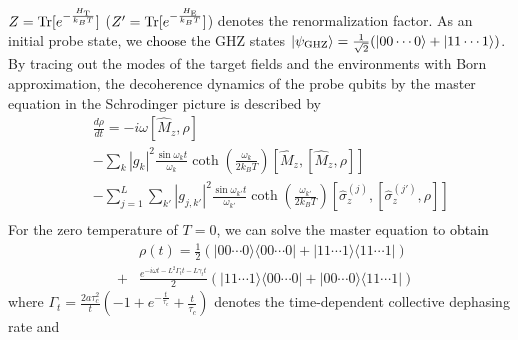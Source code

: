 \documentclass[prl,twocolumn,superscriptaddress]{revtex4}
\begin{document}
   $Z={\rm{Tr}}[e^{-\frac{H_{\rm{T}}}{k_BT}}]$ ($Z'={\rm{Tr}}[e^{-\frac{H_{\rm{E}}}{k_BT}}]$) denotes the
   renormalization factor. As an initial probe state, we \textcolor{black}{choose} the GHZ states
   $|\psi _{\rm{GHZ}}\rangle =\frac{1}{\sqrt{2}}(|00\cdots 0\rangle
   +|11\cdots 1\rangle )$.
   By tracing out the modes of the target
   fields and the environments with Born approximation,
   the decoherence dynamics of the probe
   qubits by
   the master equation in the Schrodinger picture is described by
\begin{eqnarray}
 && \frac{d\rho }{dt}
  =-i\omega [\hat{M}_z,\rho ]\nonumber \\
   &&-\sum_{k}|g_k|^2\frac{\sin \omega _kt}{\omega _k}
   \coth(\frac{\omega _k}{2k_{B}T})[\hat{M}_z,[\hat{M}_z, \rho
   ]]\nonumber \\
  &&-\sum_{j=1}^L \sum_{k'}|g_{j,k'}|^2\frac{\sin \omega _{k'}t}{\omega _{k'}}
   \coth(\frac{\omega _{k'}}{2k_{B}T}) [\hat{\sigma }^{(j)}_z,[\hat{\sigma
   }^{(j')}_z,\rho ]] \nonumber \\
   \label{master}
 \end{eqnarray}
  For the zero temperature of $T=0$, we can
 solve
 the master equation to \textcolor{black}{obtain}
      \begin{eqnarray}
    &&\rho (t)=\frac{1}{2}(|00\cdots 0\rangle \langle 00\cdots
     0|
    +|11\cdots 1\rangle \langle 11\cdots
     1|)
     \nonumber \\
     &+&\frac{e^{-i\omega t-L^2\Gamma
     _tt-L\gamma _tt}}{2}(|11\cdots 1\rangle \langle 00\cdots
     0|+|00\cdots 0\rangle \langle 11\cdots 1|)
     \nonumber 
   \end{eqnarray}
where $\Gamma _t=\frac{2a\tau _c^2}{t}(-1+e^{-\frac{t}{\tau _c}}+\frac{t}{\tau
_c})$ denotes the time-dependent collective dephasing rate and
\end{document}
